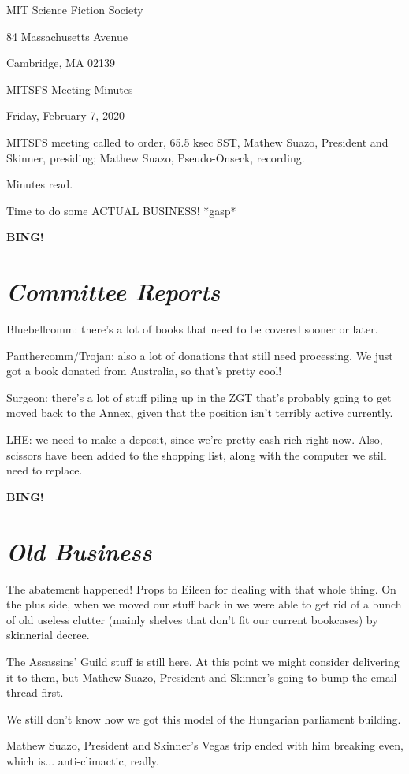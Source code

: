 \documentclass[10pt]{article}
\newcommand{\bing}{{\bf BING!} }
\newcommand{\goto}[1]{\bing \vskip 12pt \section*{{\em{#1}}}}
\newcommand{\skinner}{Mathew Suazo, President and Skinner\xspace}
\newcommand{\onseck}{Mathew Suazo, Pseudo-Onseck\xspace}
\newcommand{\meetingdate}{Friday, February 7, 2020}
\begin{document}
\begin{center}

MIT Science Fiction Society

84 Massachusetts Avenue

Cambridge, MA 02139

\vspace{12pt}

MITSFS Meeting Minutes

\meetingdate

\end{center}

\vspace{18pt}

\setlength{\parskip}{6pt}

\noindent
MITSFS meeting called to order, 65.5 ksec SST,
\skinner, presiding; \onseck, recording.

Minutes read.

Time to do some ACTUAL BUSINESS! *gasp*

\goto{Committee Reports}

Bluebellcomm: there's a lot of books that need to be covered sooner or later.

Panthercomm/Trojan: also a lot of donations that still need processing. We just got a book donated from Australia, so that's pretty cool!

Surgeon: there's a lot of stuff piling up in the ZGT that's probably going to get moved back to the Annex, given that the position isn't terribly active currently.

LHE: we need to make a deposit, since we're pretty cash-rich right now. Also, scissors have been added to the shopping list, along with the computer we still need to replace.

\goto{Old Business}

The abatement happened! Props to Eileen for dealing with that whole thing. On the plus side, when we moved our stuff back in we were able to get rid of a bunch of old useless clutter (mainly shelves that don't fit our current bookcases) by skinnerial decree.

The Assassins' Guild stuff is still here. At this point we might consider delivering it to them, but \skinner's going to bump the email thread first.

We still don't know how we got this model of the Hungarian parliament building.

\skinner's Vegas trip ended with him breaking even, which is... anti-climactic, really.
\end{document}
